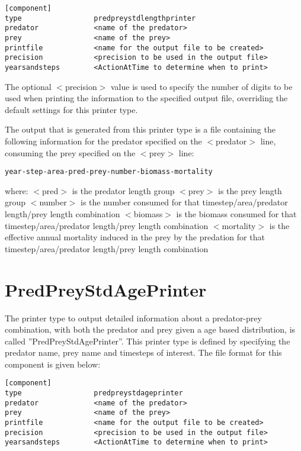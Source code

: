 \documentclass[10pt,twoside]{book}
\begin{document}
{\small\begin{verbatim}
[component]
type                 predpreystdlengthprinter
predator             <name of the predator>
prey                 <name of the prey>
printfile            <name for the output file to be created>
precision            <precision to be used in the output file>
yearsandsteps        <ActionAtTime to determine when to print>
\end{verbatim}}

The optional $<$precision$>$ value is used to specify the number of digits to be used when printing the information to the specified output file, overriding the default settings for this printer type.

\bigskip
The output that is generated from this printer type is a file containing the following information for the predator specified on the $<$predator$>$ line, consuming the prey specified on the $<$prey$>$ line:

{\small\begin{verbatim}
year-step-area-pred-prey-number-biomass-mortality
\end{verbatim}}

where:\newline
$<$pred$>$ is the predator length group\newline
$<$prey$>$ is the prey length group\newline
$<$number$>$ is the number consumed for that timestep/area/predator length/prey length combination\newline
$<$biomass$>$ is the biomass consumed for that timestep/area/predator length/prey length combination\newline
$<$mortality$>$ is the effective annual mortality induced in the prey by the predation for that timestep/area/predator length/prey length combination

\section{PredPreyStdAgePrinter}\label{sec:predpreystdageprinter}
The printer type to output detailed information about a predator-prey combination, with both the predator and prey given a age based distribution, is called ''PredPreyStdAgePrinter''.  This printer type is defined by specifying the predator name, prey name and timesteps of interest.  The file format for this component is given below:

{\small\begin{verbatim}
[component]
type                 predpreystdageprinter
predator             <name of the predator>
prey                 <name of the prey>
printfile            <name for the output file to be created>
precision            <precision to be used in the output file>
yearsandsteps        <ActionAtTime to determine when to print>
\end{verbatim}}
\end{document}
